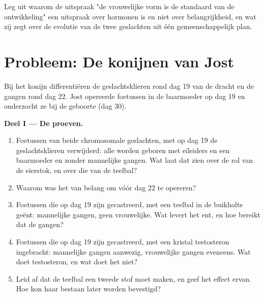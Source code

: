 \begin{exercise}[$\star\star\star$]\label{exo:g11:becoming-male-female:15}
Leg uit waarom de uitspraak "de vrouwelijke vorm is de standaard van de
ontwikkeling" een uitspraak over hormonen is en niet over belangrijkheid,
en wat zij zegt over de evolutie van de twee geslachten uit één
gemeenschappelijk plan.
\end{exercise}

\section{Probleem: De konijnen van Jost}

\begin{problem}
\label{pb:g11:becoming-male-female:1}
Bij het konijn differentiëren de geslachtsklieren rond dag 19 van de
dracht en de gangen rond dag 22. Jost opereerde foetussen in de
baarmoeder op dag 19 en onderzocht ze bij de geboorte (dag 30).

\medskip
\noindent\textbf{Deel I --- De proeven.}
\begin{enumerate}
  \item Foetussen van beide chromosomale geslachten, met op dag 19 de
        geslachtsklieren verwijderd: alle worden geboren met eileiders en
        een baarmoeder en zonder mannelijke gangen. Wat laat dat zien over
        de rol van de eierstok, en over die van de teelbal?
  \item Waarom was het van belang om vóór dag 22 te opereren?
  \item Foetussen die op dag 19 zijn gecastreerd, met een teelbal in de
        buikholte geënt: mannelijke gangen, geen vrouwelijke. Wat levert
        het ent, en hoe bereikt dat de gangen?
  \item Foetussen die op dag 19 zijn gecastreerd, met een kristal
        testosteron ingebracht: mannelijke gangen aanwezig, vrouwelijke
        gangen eveneens. Wat doet testosteron, en wat doet het niet?
  \item Leid af dat de teelbal een tweede stof moet maken, en geef het
        effect ervan. Hoe kon haar bestaan later worden bevestigd?
\end{enumerate}


\end{problem}
